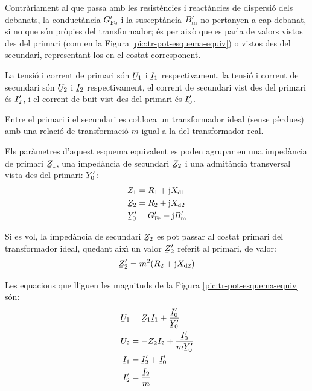 Contr\`{a}riament al que passa amb les resist\`{e}ncies i react\`{a}ncies de dispersi\'{o} dels debanats, la conduct\`{a}ncia $G_\mathrm{Fe}'$ i la suscept\`{a}ncia $B_\mathrm{m}'$ no pertanyen a cap debanat, si no que s\'{o}n pr\`{o}pies del transformador; \'{e}s per aix\`{o} que es parla de valors vistos des del primari (com en la Figura \vref{pic:tr-pot-esquema-equiv}) o vistos des del secundari, representant-los en el costat corresponent.

La tensi\'{o} i corrent de primari s\'{o}n $\cmplx{U}_1$ i $\cmplx{I}_1$ respectivament, la tensi\'{o} i corrent de secundari s\'{o}n $\cmplx{U}_2$ i $\cmplx{I}_2$ respectivament, el corrent de secundari vist des del primari \'{e}s $\cmplx{I}_2'$, i el corrent de buit vist des del primari \'{e}s $\cmplx{I}_0'$.

Entre el primari i el secundari es co{\l.l}oca un transformador ideal (sense p\`{e}rdues) amb una relaci\'{o} de transformaci\'{o} $m$ igual a la del transformador real.

Els par\`{a}metres d'aquest esquema equivalent es poden agrupar en una imped\`{a}ncia de primari $\cmplx{Z}_1$, una imped\`{a}ncia de secundari $\cmplx{Z}_2$ i una  admit\`{a}ncia transversal vista des del primari: $\cmplx{Y}_0'$:
\begin{align}
    \cmplx{Z}_1 &= R_1 + \ju X\ped{d1} \\
    \cmplx{Z}_2 &= R_2 + \ju X\ped{d2}\\
    \cmplx{Y}_0' &= G\ped{Fe}'- \ju B\ped{m}'
\end{align}

Si es vol, la imped\`{a}ncia de secundari $\cmplx{Z}_2$ es pot passar al costat primari del transformador ideal, quedant aix\'{\i} un valor $\cmplx{Z}_2'$ referit al primari, de valor:
\begin{equation}
    \cmplx{Z}_2' = m^2 (R_2 + \ju X\ped{d2})
\end{equation}

Les equacions que lliguen les magnituds de la Figura \vref{pic:tr-pot-esquema-equiv} s\'{o}n:
\begin{align}
    \cmplx{U}_1  &=   \cmplx{Z}_1 \cmplx{I}_1 + \frac{\cmplx{I}_0'}{\cmplx{Y}_0'} \\
    \cmplx{U}_2  &= - \cmplx{Z}_2 \cmplx{I}_2 + \frac{\cmplx{I}_0'}{m \cmplx{Y}_0' }\\
    \cmplx{I}_1  &=   \cmplx{I}_2' + \cmplx{I}_0'\\
    \cmplx{I}_2' &=   \frac{\cmplx{I}_2}{m}
\end{align}


